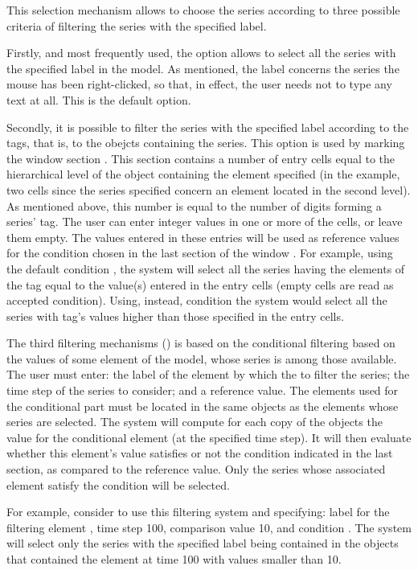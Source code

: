 \documentclass [11pt,a4paper] {book}
\begin{document}
This selection mechanism allows to choose the series according to three possible criteria of filtering the series with the specified label.

Firstly, and most frequently used, the option  allows to select all the series with the specified label in the model. As mentioned, the label concerns the series the mouse has been right-clicked, so that, in effect, the user needs not to type any text at all. This is the default option.

Secondly, it is possible to filter the series with the specified label according to the tags, that is, to the obejcts containing the series. This option is used by marking the window section . This section contains a number of entry cells equal to the hierarchical level of the object containing the element specified (in the example, two cells since the series specified concern an element located in the second level). As mentioned above, this number is equal to the number of digits forming a series' tag. The user can enter integer values in one or more of the cells, or leave them empty. The values entered in these entries will be used as reference values for the condition chosen in the last section of the window . For example, using the default condition , the system will select all the series having the elements of the tag equal to the value(s) entered in the entry cells (empty cells are read as accepted condition). Using, instead, condition  the system would select all the series with tag's values higher than those specified in the entry cells.

The third filtering mechanisms () is based on the conditional filtering based on the values of some element of the model, whose series is among those available. The user must enter: the label of the element by which the to filter the series; the time step of the series to consider; and a reference value. The elements used for the conditional part must be located in the same objects as the elements whose series are selected. The system will compute for each copy of the objects the value for the conditional element (at the specified time step). It will then evaluate whether this element's value satisfies or not the condition indicated in the last section, as compared to the reference value. Only the series whose associated element satisfy the condition will be selected. 

For example, consider to use this filtering system and specifying: label for the filtering element , time step 100, comparison value 10, and condition .  The system will select only the series with the specified label being contained in the objects that contained the element  at time 100 with values smaller than 10.
\end{document}
